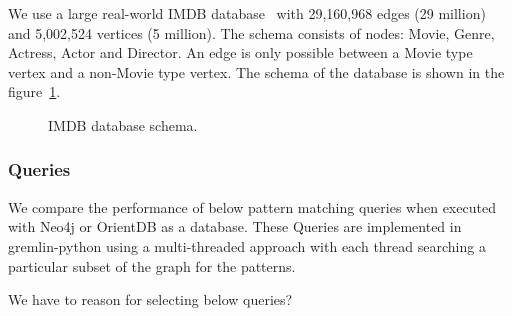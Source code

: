 We use a large real-world IMDB database~\cite{IMDb96:online} with 29,160,968 edges (29 million) and 5,002,524 vertices (5 million). The schema consists of nodes: Movie, Genre,
Actress, Actor and Director. An edge is only possible between a Movie type vertex and a non-Movie type vertex. 
The schema of the database is shown in the figure~\ref{fig:schema}. 

\begin{figure}[t]
\centering
{}
\caption{IMDB database schema.}
\label{fig:schema}
\centering
\end{figure}

\subsubsection{Queries}

We compare the performance of below pattern matching queries when executed with Neo4j or OrientDB as a database. These Queries are implemented in gremlin-python using a multi-threaded approach with each thread searching a particular subset of the graph for the patterns. 

We have to reason for selecting below queries?

